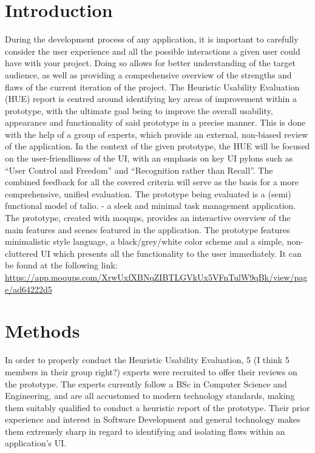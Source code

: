 \section{Introduction}\label{sec:introduction}

During the development process of any application, it is important to carefully consider the user experience and all the possible interactions a given user could have with your project.
Doing so allows for better understanding of the target audience, as well as providing a comprehensive overview of the strengths and flaws of the current iteration of the project.
The Heuristic Usability Evaluation (HUE) report is centred around identifying key areas of improvement within a prototype, with the ultimate goal being to improve the overall usability, appearance and functionality of said prototype in a precise manner.
This is done with the help of a group of experts, which provide an external, non-biased review of the application.
In the context of the given prototype, the HUE will be focused on the user-friendliness of the UI, with an emphasis on key UI pylons such as ``User Control and Freedom'' and ``Recognition rather than Recall''.
The combined feedback for all the covered criteria will serve as the basis for a more comprehensive, unified evaluation.
The prototype being evaluated is a (semi) functional model of talio.
- a sleek and minimal task management application.
The prototype, created with moqups, provides an interactive overview of the main features and scenes featured in the application.
The prototype features minimalistic style language, a black/grey/white color scheme and a simple, non-cluttered UI which presents all the functionality to the user immediately.
It can be found at the following link: \url{https://app.moqups.com/XrwUxfXBNqZIBTLGVkUx5VFnTulW9qBk/view/page/ad64222d5}

\section*{Methods}

In order to properly conduct the Heuristic Usability Evaluation, 5 (I think 5 members in their group right?) experts were recruited to offer their reviews on the prototype.
The experts currently follow a BSc in Computer Science and Engineering, and are all accustomed to modern technology standards, making them suitably qualified to conduct a heuristic report of the prototype.
Their prior experience and interest in Software Development and general technology makes them extremely sharp in regard to identifying and isolating flaws within an application's UI\@.


